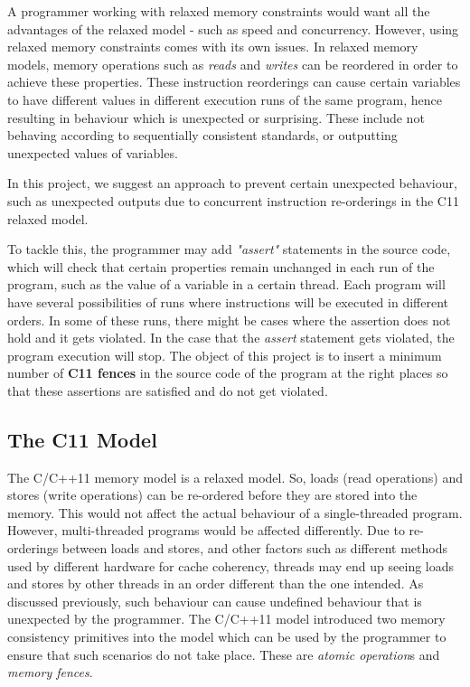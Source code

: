 \par
A programmer working with relaxed memory constraints would want all the advantages of the relaxed model - such as speed and concurrency. However, using relaxed memory constraints comes with its own issues. In relaxed memory models, memory operations such as \textit{reads} and \textit{writes} can be reordered in order to achieve these properties. These instruction reorderings can cause certain variables to have different values in different execution runs of the same program, hence resulting in behaviour which is unexpected or surprising. These include not behaving according to sequentially consistent standards, or outputting unexpected values of variables.

\par
In this project, we suggest an approach to prevent certain unexpected behaviour, such as unexpected outputs due to concurrent instruction re-orderings in the C11 relaxed model.

\par
To tackle this, the programmer may add \textit{"assert"} statements in the source code, which will check that certain properties remain unchanged in each run of the program, such as the value of a variable in a certain thread. Each program will have several possibilities of runs where instructions will be executed in different orders. In some of these runs, there might be cases where the assertion does not hold and it gets violated. In the case that the \textit{assert} statement gets violated, the program execution will stop. The object of this project is to insert a minimum number of \textbf{C11 fences} in the source code of the program at the right places so that these assertions are satisfied and do not get violated.

\subsection{The C11 Model}
\par
The C/C++11 memory model is a relaxed model. So, loads (read operations) and stores (write operations) can be re-ordered before they are stored into the memory. This would not affect the actual behaviour of a single-threaded program. However, multi-threaded programs would be affected differently. Due to re-orderings between loads and stores, and other factors such as different methods used by different hardware for cache coherency, threads may end up seeing loads and stores by other threads in an order different than the one intended. As discussed previously, such behaviour can cause undefined behaviour that is unexpected by the programmer. The C/C++11 model introduced two memory consistency primitives into the model which can be used by the programmer to ensure that such scenarios do not take place. These are \textit{atomic operation}s and \textit{memory fences}. 

